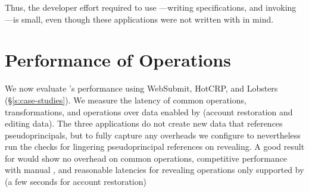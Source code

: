 Thus, the developer effort required to use \sys---writing \sys specifications, and
invoking \sys---is small, even though these applications were not written with
\sys in mind.

\section{Performance of \sys Operations}
\label{s:eval-ops}

%
We now evaluate \sys's performance using WebSubmit,
HotCRP, and Lobsters (\S\ref{s:case-studies}).
%
%
We measure the latency of common operations, \xxing transformations,
and operations over \xxed data enabled by \sys
(\eg account restoration and editing \xxed data).
%
The three applications do not create new data that references pseudoprincipals,
but to fully capture any overheads we configure \sys to nevertheless run the
checks for lingering pseudoprincipal references on revealing.
%
A good result for \sys would show no overhead on common operations,
competitive performance with manual \xxing, and reasonable
latencies for revealing operations only supported by \sys
(\eg a few seconds for account restoration)
%

